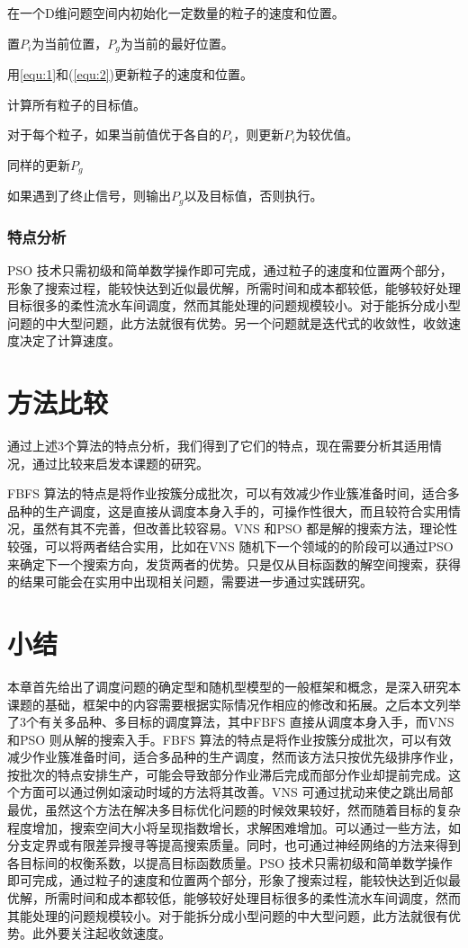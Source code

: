 \begin{asparaenum}
\renewcommand{\labelenumi}{\heiti 步骤\theenumi~}
\item 在一个D维问题空间内初始化一定数量的粒子的速度和位置。
\item 置$P_i$为当前位置，$P_g$为当前的最好位置。
\item 用\eqref{equ:1}和(\ref{equ:2})更新粒子的速度和位置。
\item 计算所有粒子的目标值。
\item 对于每个粒子，如果当前值优于各自的$P_i$，则更新$P_i$为较优值。
\item 同样的更新$P_g$
\item 如果遇到了终止信号，则输出$P_g$以及目标值，否则执行。
\end{asparaenum}

\subsubsection{特点分析}
PSO 技术只需初级和简单数学操作即可完成，通过粒子的速度和位置两个部分，形象了搜索过程，能较快达到近似最优解，所需时间和成本都较低，能够较好处理目标很多的柔性流水车间调度，然而其能处理的问题规模较小。对于能拆分成小型问题的中大型问题，此方法就很有优势。另一个问题就是迭代式的收敛性，收敛速度决定了计算速度。
\section{方法比较}
通过上述3个算法的特点分析，我们得到了它们的特点，现在需要分析其适用情况，通过比较来启发本课题的研究。

FBFS 算法的特点是将作业按簇分成批次，可以有效减少作业簇准备时间，适合多品种的生产调度，这是直接从调度本身入手的，可操作性很大，而且较符合实用情况，虽然有其不完善，但改善比较容易。VNS 和PSO 都是解的搜索方法，理论性较强，可以将两者结合实用，比如在VNS 随机下一个领域的的阶段可以通过PSO 来确定下一个搜索方向，发货两者的优势。只是仅从目标函数的解空间搜索，获得的结果可能会在实用中出现相关问题，需要进一步通过实践研究。

\section{小结}
本章首先给出了调度问题的确定型和随机型模型的一般框架和概念，是深入研究本课题的基础，框架中的内容需要根据实际情况作相应的修改和拓展。之后本文列举了3个有关多品种、多目标的调度算法，其中FBFS 直接从调度本身入手，而VNS 和PSO 则从解的搜索入手。FBFS 算法的特点是将作业按簇分成批次，可以有效减少作业簇准备时间，适合多品种的生产调度，然而该方法只按优先级排序作业，按批次的特点安排生产，可能会导致部分作业滞后完成而部分作业却提前完成。这个方面可以通过例如滚动时域的方法将其改善。VNS 可通过扰动来使之跳出局部最优，虽然这个方法在解决多目标优化问题的时候效果较好，然而随着目标的复杂程度增加，搜索空间大小将呈现指数增长，求解困难增加。可以通过一些方法，如分支定界或有限差异搜寻等提高搜索质量。同时，也可通过神经网络的方法来得到各目标间的权衡系数，以提高目标函数质量。PSO 技术只需初级和简单数学操作即可完成，通过粒子的速度和位置两个部分，形象了搜索过程，能较快达到近似最优解，所需时间和成本都较低，能够较好处理目标很多的柔性流水车间调度，然而其能处理的问题规模较小。对于能拆分成小型问题的中大型问题，此方法就很有优势。此外要关注起收敛速度。